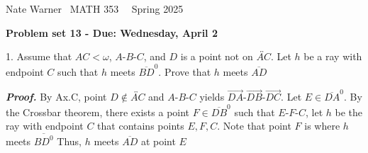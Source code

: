 \documentclass{report}
\title{\Huge{}}
\author{\huge{Nathan Warner}}
\date{\huge{}}
\begin{document}
    \pagebreak \bigbreak \noindent
    Nate Warner \ \quad \quad \quad \quad \quad \quad \quad \quad \quad \quad \quad \quad  MATH 353 \quad  \quad \quad \quad \quad \quad \quad \quad \quad \ \ \quad \quad Spring 2025
    \begin{center}
        \textbf{Problem set 13 - Due: Wednesday, April 2}
    \end{center}
    \bigbreak \noindent 
    \begin{mdframed}
        1. Assume that $AC < \omega$, $ A\text{-}B\text{-}C$, and $D$ is a point not on $\overleftrightarrow{AC}$. Let $h$ be a ray with endpoint $C$ such that $h$ meets $\overline{BD}^{0} $. Prove that $h$ meets $\overline{AD} $
    \end{mdframed}
    \bigbreak \noindent 
    \textbf{\textit{Proof.}} By Ax.C, point $D\not\in \overleftrightarrow{AC}$  and $ A\text{-}B\text{-}C$ yields $ \overrightarrow{DA}\text{-}\overrightarrow{DB}\text{-}\overrightarrow{DC}$. Let $E \in \overline{DA}^{0}$. By the Crossbar theorem, there exists a point $F \in \overline{DB}^{0}$ such that $ E\text{-}F\text{-}C$, let $h$ be the ray with endpoint $C$ that contains points $E,F,C$. Note that point $F$ is where $h$ meets $ \overline{BD^{0}} $
    \bigbreak \noindent 
    Thus, $ h$ meets $\overline{AD}$ at point $E$ \endpf
\end{document}
